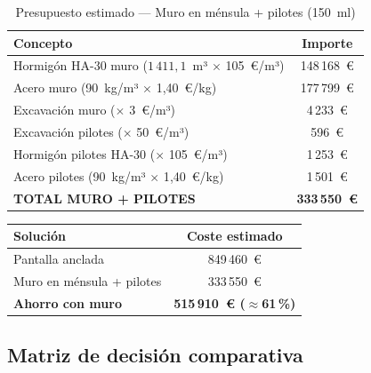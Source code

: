 \begin{table}[H]
  \centering
  \caption{Presupuesto estimado — Muro en ménsula + pilotes (150~ml)}
  \label{tab:presup_muro}
  \begin{tabular}{@{}lc@{}}
    \toprule
    \textbf{Concepto} & \textbf{Importe} \\
    \midrule
    Hormigón HA-30 muro ($1\,411{,}1$~m³ $\times$ 105~€/m³)  & 148\,168~€ \\
    Acero muro (90~kg/m³ $\times$ 1{,}40~€/kg)                & 177\,799~€ \\
    Excavación muro ($\times$ 3~€/m³)                          &   4\,233~€ \\
    Excavación pilotes ($\times$ 50~€/m³)                      &     596~€ \\
    Hormigón pilotes HA-30 ($\times$ 105~€/m³)                 &   1\,253~€ \\
    Acero pilotes (90~kg/m³ $\times$ 1{,}40~€/kg)              &   1\,501~€ \\
    \midrule
    \textbf{TOTAL MURO + PILOTES}                              & \textbf{333\,550~€} \\
    \bottomrule
  \end{tabular}
\end{table}

\begin{resultadobox}
  \begin{center}
  \begin{tabular}{lc}
    \toprule
    \textbf{Solución} & \textbf{Coste estimado} \\
    \midrule
    Pantalla anclada            & 849\,460~€ \\
    Muro en ménsula + pilotes   & 333\,550~€ \\
    \midrule
    \textbf{Ahorro con muro}    & \textbf{515\,910~€ ($\approx$61\,\%)} \\
    \bottomrule
  \end{tabular}
  \end{center}
\end{resultadobox}

\subsection{Matriz de decisión comparativa}
\label{subsec:matriz_decision}

